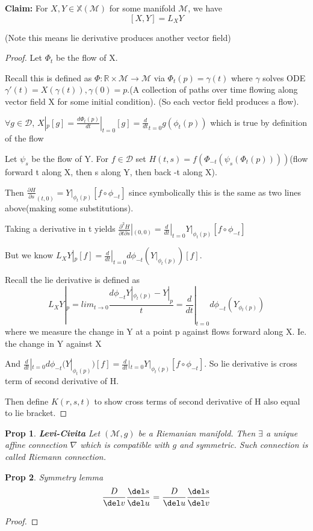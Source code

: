 \documentclass[11pt]{article}
\newcommand{\R}{\mathbb{R}}
\newcommand{\m}{\mathcal{M}}
\newcommand{\dD}{\mathcal{D}}
\newtheorem{prop}{Prop}
\begin{document}
\textbf{Claim:} For $X,Y \in \mathbb{X}(\m)$ for some manifold $\m$, we have
\[
	[X,Y] = L_XY
\]

(Note this means lie derivative produces another vector field)

\begin{proof}

	Let $\Phi_t$ be the flow of X. 

	Recall this is defined as $\Phi: \R \times \m \to \m$ via $\Phi_t(p) = \gamma(t)$ where $\gamma$ solves ODE $\gamma'(t) = X(\gamma(t)), \gamma(0) = p$.(A collection of paths over time flowing along vector field X for some initial condition). (So each vector field produces a flow).

	$\forall g \in \dD$, $X|_p[g] = \frac{d\Phi_t(p)}{dt}|_{t=0}[g] = \frac{d}{dt}_{t=0}g(\phi_t(p))$ which is true by definition of the flow

	Let $\psi_s$ be the flow of Y. For $f \in \dD$ set $H(t,s) = f(\Phi_{-t}(\psi_s(\Phi_t(p))))$(flow forward t along X, then s along Y, then back -t along X). 

	Then $\frac{\partial H}{\partial s}_{(t,0)} = Y|_{\phi_t(p)} [f \circ \phi_{-t}]$ since symbolically this is the same as two lines above(making some substitutions).

	Taking a derivative in t yields $\frac{\partial^2 H}{\partial t \partial s}|_{(0,0)} = \frac{d}{dt}|_{t=0} Y|_{\phi_t(p)}[f \circ \phi_{-t}]$

	But we know $L_XY|_p[f] = \frac{d}{dt}|_{t=0} d\phi_{-t}(Y|_{\phi_t(p)})[f]$.

	Recall the lie derivative is defined as 
	\[
		L_X Y|_p = lim_{t\to 0} \frac{d\phi_{-t} Y|_{\phi_t(p)}-Y|_p}{t} = \frac{d}{dt}|_{t=0}d\phi_{-t}(Y_{\phi_t(p)})
	\]
	where we measure the change in Y at a point p against flows forward along X. Ie. the change in Y against X

	And $\frac{d}{dt}|_{t=0} d\phi_{-t}(Y|_{\phi_t(p)})[f] = \frac{d}{dt}|_{t=0} Y|_{\phi_t(p)}[f \circ \phi_{-t}]$. So lie derivative is cross term of second derivative of H.

	Then define $K(r,s,t)$ to show cross terms of second derivative of H also equal to lie bracket. 

\end{proof}


\begin{prop}\textbf{Levi-Civita}
	Let $(\m,g)$ be a Riemanian manifold. Then $\exists$ a unique affine connection $\nabla$ which is compatible with $g$ and symmetric. Such connection is called Riemann connection.
\end{prop}

\begin{prop}
	Symmetry lemma
	\begin{align*}
		\frac{D }{\del v} \frac{\del s}{\del u} = \frac{D}{\del u} \frac{\del s}{\del v}
	\end{align*}
\end{prop}

\begin{proof}
	
\end{proof}
\end{document}
